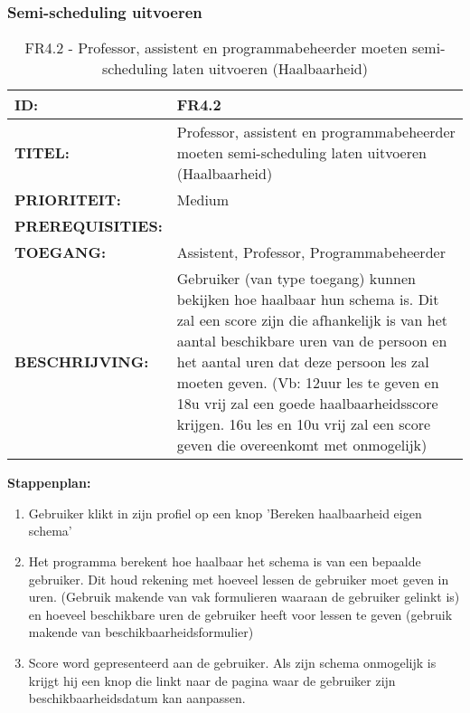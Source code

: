 \subsubsection{Semi-scheduling uitvoeren}
\noindent\begin{table}[H]
	\begin{tabular}{l | p{10cm}}
    \textbf{ID:} & FR4.2 \\ \hline
    \textbf{TITEL:} & Professor, assistent en programmabeheerder moeten semi-scheduling laten uitvoeren (Haalbaarheid)\\ \hline
    \textbf{PRIORITEIT:} &  Medium \\ \hline
    \textbf{PREREQUISITIES:} & \\ \hline
    \textbf{TOEGANG:} & Assistent, Professor, Programmabeheerder \\ \hline
    \textbf{BESCHRIJVING:} & Gebruiker (van type toegang) kunnen bekijken hoe haalbaar hun schema is. Dit zal een score zijn die afhankelijk is van het aantal beschikbare uren van de persoon en het aantal uren dat deze persoon les zal moeten geven. (Vb: 12uur les te geven en 18u vrij zal een goede haalbaarheidsscore krijgen. 16u les en 10u vrij zal een score geven die overeenkomt met onmogelijk)\\
    \end{tabular}
    \caption{FR4.2 - Professor, assistent en programmabeheerder moeten semi-scheduling laten uitvoeren (Haalbaarheid)}
    \label{tab:FR4.2 - Professor, assistent en programmabeheerder moeten semi-scheduling laten uitvoeren (Haalbaarheid)}
\end{table}

\textbf{Stappenplan:}
	\begin{enumerate}
	\item Gebruiker klikt in zijn profiel op een knop 'Bereken haalbaarheid eigen schema'
	\item Het programma berekent hoe haalbaar het schema is van een bepaalde gebruiker. Dit houd rekening met hoeveel lessen de gebruiker moet geven in uren. (Gebruik makende van vak formulieren waaraan de gebruiker gelinkt is) en hoeveel beschikbare uren de gebruiker heeft voor lessen te geven (gebruik makende van beschikbaarheidsformulier)
	\item Score word gepresenteerd aan de gebruiker. Als zijn schema onmogelijk is krijgt hij een knop die linkt naar de pagina waar de gebruiker zijn beschikbaarheidsdatum kan aanpassen.
	\end{enumerate}
        
